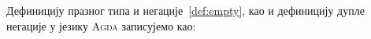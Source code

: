 Дефиницију празног типа и негације~\ref{def:empty}, као и дефиницију дупле негације у језику \textsc{Agda} записујемо као:
\begin{code}%
\>[0]\AgdaSpace{}%
\AgdaSymbol{:}\AgdaSpace{}%
\AgdaSpace{}%
\AgdaSpace{}%
\AgdaSpace{}%
\AgdaSpace{}%
\<%
\\
\>[0]\AgdaSpace{}%
\AgdaSpace{}%
\AgdaSymbol{=}\AgdaSpace{}%
\AgdaSpace{}%
\AgdaSpace{}%
\<%
\\
%
\\[\AgdaEmptyExtraSkip]%
\>[0]\AgdaSpace{}%
\AgdaSymbol{:}\AgdaSpace{}%
\AgdaSpace{}%
\AgdaSpace{}%
\AgdaSpace{}%
\AgdaSpace{}%
\<%
\\
\>[0]\AgdaSpace{}%
\AgdaSpace{}%
\AgdaSymbol{=}\AgdaSpace{}%
\AgdaSpace{}%
\AgdaSpace{}%
\<%
\\
%
\\[\AgdaEmptyExtraSkip]%
\>[0]\AgdaSpace{}%
\AgdaSymbol{:}\AgdaSpace{}%
\AgdaSpace{}%
\AgdaSpace{}%
\AgdaSpace{}%
\AgdaSpace{}%
\<%
\\
\>[0]\AgdaSpace{}%
\AgdaSpace{}%
\AgdaSymbol{=}\AgdaSpace{}%
\AgdaSpace{}%
\AgdaSymbol{(}\AgdaSpace{}%
\AgdaSymbol{)}\<%
\end{code}

